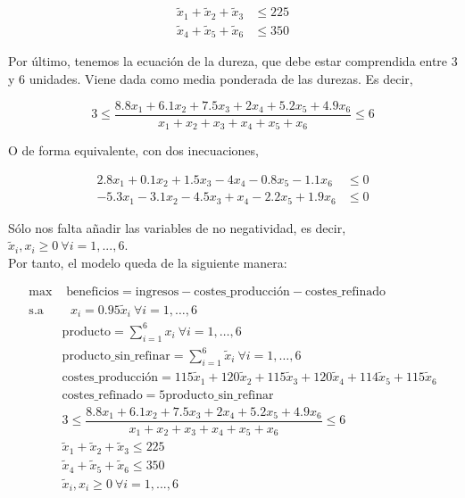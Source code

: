 \documentclass[12pt,a4paper,twoside,openright,titlepage,final]{article}
\begin{document}
\begin{align}
\tilde{x}_1 + \tilde{x}_2 + \tilde{x}_3 & \leq 225\\
\tilde{x}_4 + \tilde{x}_5 + \tilde{x}_6 & \leq 350
\end{align}

Por último, tenemos la ecuación de la dureza, que debe estar comprendida entre 3 y 6 unidades. Viene dada como media ponderada de las durezas. Es decir,

\[ 3 \leq \dfrac{8.8x_1 + 6.1x_2 + 7.5x_3 + 2x_4 + 5.2x_5 + 4.9x_6}{x_1 + x_2 + x_3 + x_4 + x_5 + x_6} \leq 6 \]

O de forma equivalente, con dos inecuaciones, 

\begin{align*}
2.8x_1 + 0.1x_2 + 1.5x_3 - 4x_4 -0.8x_5 - 1.1x_6 & \leq 0 \\
-5.3x_1 - 3.1x_2 - 4.5x_3 + x_4 -2.2x_5 + 1.9x_6 & \leq 0
\end{align*}

Sólo nos falta añadir las variables de no negatividad, es decir, $\tilde{x}_i, x_i \geq 0 \ \forall i=1,...,6$.\\

Por tanto, el modelo queda de la siguiente manera:

\begin{align*}
\max & \text{ beneficios} = \text{ingresos} - \text{costes\_producción} - \text{costes\_refinado}\\
\text{s.a} & \text{\ } x_i = 0.95\tilde{x}_i \ \forall i = 1, \dots, 6 \\
& \text{producto} = \sum_{i=1}^{6} x_i \ \forall i = 1, \dots, 6 \\
&\text{producto\_sin\_refinar} = \sum_{i=1}^{6} \tilde{x}_i \ \forall i = 1, \dots, 6\\
&\text{costes\_producción} = 115\tilde{x}_1 + 120\tilde{x}_2 + 115\tilde{x}_3 + 120\tilde{x}_4 + 114\tilde{x}_5 + 115\tilde{x}_6 \\
&\text{costes\_refinado} = 5\text{producto\_sin\_refinar} \\
& 3 \leq \dfrac{8.8x_1 + 6.1x_2 + 7.5x_3 + 2x_4 + 5.2x_5 + 4.9x_6}{x_1 + x_2 + x_3 + x_4 + x_5 + x_6} \leq 6\\
&\tilde{x}_1 + \tilde{x}_2 + \tilde{x}_3 \leq 225\\
&\tilde{x}_4 + \tilde{x}_5 + \tilde{x}_6 \leq 350\\
&\tilde{x}_i, x_i \geq 0 \ \forall i=1,...,6
\end{align*}
\end{document}

